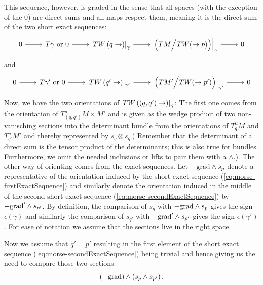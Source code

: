 \begin{definition}
	This sequence, however, is graded in the sense that all spaces (with the exception of the $0$) are direct sums and all maps respect them, meaning it is the direct sum of the two short exact sequences:
	\begin{equation}\label{eq:morse-firstExactSequence}
		\begin{tikzcd}
			0 \arrow[r]& T{\gamma} \text{ or }0\arrow[r]&\restr{TW\left(q\to \right)}{{\gamma}}\arrow[r]&
			\restr{\Big(TM\Big/ TW(\to p) \Big)}{{\gamma}} \arrow[r] &0 
		\end{tikzcd}
	\end{equation}
	and 
	\begin{equation}\label{eq:morse-secondExactSequence}
		\begin{tikzcd}
			0 \arrow[r]& T{\gamma'} \text{ or }0 \arrow[r]&\restr{TW\left(q'\to \right)}{{\gamma'}}\arrow[r]&
			\restr{\Big(TM'\Big/ TW(\to p') \Big)}{{\gamma'}} \arrow[r] &0
		\end{tikzcd}
	\end{equation}
	Now, we have the two orientations of $\left.TW\left((q,q')\to \right)\right|_{\tilde{\gamma}}$: The first one comes from the orientation of $T_{(q,q')}^uM\times M'$ and is given as the wedge product of two non-vanisching sections into the determinant bundle from the orientations of $T_q^uM$ and $T_{q'}^uM'$ and thereby represented by $s_q \otimes s_{q'}$( Remember that the determinant of a direct sum is the tensor product of the determinants; this is also true for bundles. Furthermore, we omit the needed inclusions or lifts to pair them with a $\wedge$.). 
	The other way of orienting comes from the exact sequences. Let $-\mathrm{grad}\wedge s_p$ denote a representative of the orientation induced by the short exact sequence (\ref{eq:morse-firstExactSequence}) and similarly denote the orientation induced in the middle of the second short exact sequence (\ref{eq:morse-secondExactSequence}) by $-\mathrm{grad}'\wedge s_{p'}$.  
	By definition, the comparison of $s_q$ with $-\mathrm{grad}\wedge s_p$ gives the sign $\epsilon(\gamma)$ and similarly the comparison of $s_{q'}$ with $-\mathrm{grad}'\wedge s_{p'}$ gives the sign $\epsilon(\gamma')$. For ease of notation we assume that the sections live in the right space. 

	Now we assume that $q'=p'$ resulting in the first element of the short exact sequence (\ref{eq:morse-secondExactSequence}) being trivial and hence giving us the need to compare those two sections:
	\begin{equation*}
		(-\mathrm{grad} )\wedge ( s_p\wedge s_{p'})\,.
	\end{equation*}


\end{definition}
